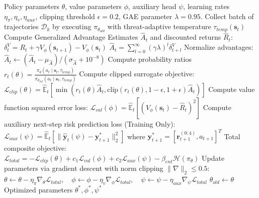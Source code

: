 \documentclass[ASNA,twocolumn]{USG}
\begin{document}
\begin{algorithm}[!htbp]
\caption{Threat-Aware Policy Optimization with Auxiliary Risk Regularization}
\label{alg:policy_training}
\small
\begin{algorithmic}[1]
\Require Policy parameters $\theta$, value parameters $\phi$, auxiliary head $\psi$, learning rates $\eta_\pi, \eta_v, \eta_{aux}$, clipping threshold $\epsilon = 0.2$, GAE parameter $\lambda = 0.95$.
    \State Collect batch of trajectories $\mathcal{D}_k$ by executing $\pi_{\theta_{old}}$ with threat-adaptive temperature $\tau_{temp}(\mathbf{s}_t)$
    \State Compute Generalized Advantage Estimates $\hat{A}_t$ and discounted returns $\hat{R}_t$:
    \State \quad $\delta_t^V = R_t + \gamma V_\phi(\mathbf{s}_{t+1}) - V_\phi(\mathbf{s}_t)$
    \State \quad $\hat{A}_t = \sum_{l=0}^{\infty} (\gamma \lambda)^l \delta_{t+l}^V$
    \State Normalize advantages: $\hat{A}_t \leftarrow (\hat{A}_t - \mu_{\hat{A}}) / (\sigma_{\hat{A}} + 10^{-8})$
        \State Compute probability ratios $r_t(\theta) = \frac{\pi_\theta(a_t \mid \mathbf{s}_t, \tau_{temp})}{\pi_{\theta_{old}}(a_t \mid \mathbf{s}_t, \tau_{temp})}$
        \State Compute clipped surrogate objective:
        \State \quad $\mathcal{L}_{clip}(\theta) = \hat{\mathbb{E}}_t \left[ \min\left(r_t(\theta)\hat{A}_t, \text{clip}(r_t(\theta), 1-\epsilon, 1+\epsilon)\hat{A}_t\right) \right]$
        \State Compute value function squared error loss:
        \State \quad $\mathcal{L}_{val}(\phi) = \hat{\mathbb{E}}_t \left[ (V_\phi(\mathbf{s}_t) - \hat{R}_t)^2 \right]$
        \State Compute auxiliary next-step risk prediction loss (Training Only):
        \State \quad $\mathcal{L}_{aux}(\psi) = \hat{\mathbb{E}}_t \left[ \|\hat{\mathbf{y}}_t(\psi) - \mathbf{y}_{t+1}^*\|_2^2 \right]$ where $\mathbf{y}_{t+1}^* = [\mathbf{r}_{t+1}^{(0:4)}, a_{t+1}]^T$
        \State Total composite objective: $\mathcal{L}_{total} = -\mathcal{L}_{clip}(\theta) + c_1 \mathcal{L}_{val}(\phi) + c_2 \mathcal{L}_{aux}(\psi) - \beta_{ent} \mathcal{H}(\pi_\theta)$
        \State Update parameters via gradient descent with norm clipping $\|\nabla\|_2 \le 0.5$:
        \State \quad $\theta \leftarrow \theta - \eta_\pi \nabla_\theta \mathcal{L}_{total}, \quad \phi \leftarrow \phi - \eta_v \nabla_\phi \mathcal{L}_{total}, \quad \psi \leftarrow \psi - \eta_{aux} \nabla_\psi \mathcal{L}_{total}$
    \EndFor
    \State $\theta_{old} \leftarrow \theta$
\EndFor
\State \Return Optimized parameters $\theta^*, \phi^*, \psi^*$
\end{algorithmic}
\end{algorithm}
\end{document}
